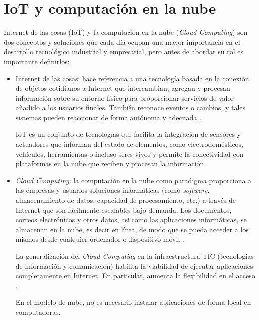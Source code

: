 \section{IoT y computación en la nube}

Internet de las cosas (IoT) y la computación en la nube (\emph{Cloud Computing}) son dos conceptos y soluciones que cada día ocupan una mayor importancia en el desarrollo tecnológico industrial y empresarial, pero antes de abordar su rol es importante definirlos:

\begin{itemize}
\item Internet de las cosas: hace referencia a una tecnología basada en la conexión de objetos cotidianos a Internet que intercambian, agregan y procesan información sobre su entorno físico para proporcionar servicios de valor añadido a los usuarios finales. También reconoce eventos o cambios, y tales sistemas pueden reaccionar de forma autónoma y adecuada \citep{BOOK:1}.

IoT es un conjunto de tecnologías que facilita la integración de sensores y actuadores que informan del estado de elementos, como electrodomésticos, vehículos, herramientas o incluso seres vivos y permite la conectividad con plataformas en la nube que reciben y procesan la información.

\item \emph{Cloud Computing}: la computación en la nube como paradigma proporciona a las empresas y usuarios soluciones informáticas (como \emph{software}, almacenamiento de datos, capacidad de procesamiento, etc.) a través de Internet que son fácilmente escalables bajo demanda. Los documentos, correos electrónicos y otros datos, así como las aplicaciones informáticas, se almacenan en la nube, es decir en línea, de modo que se pueda acceder a los mismos desde cualquier ordenador o dispositivo móvil \citep{BOOK:1}.

La generalización del \emph{Cloud Computing} en la infraestructura TIC (tecnologías de información y comunicación) habilita la viabilidad de ejecutar aplicaciones completamente en Internet. En particular, aumenta la flexibilidad en el acceso \citep{BOOK:1}.


En el modelo de nube, no es necesario instalar aplicaciones de forma local en computadoras.

\end{itemize}

